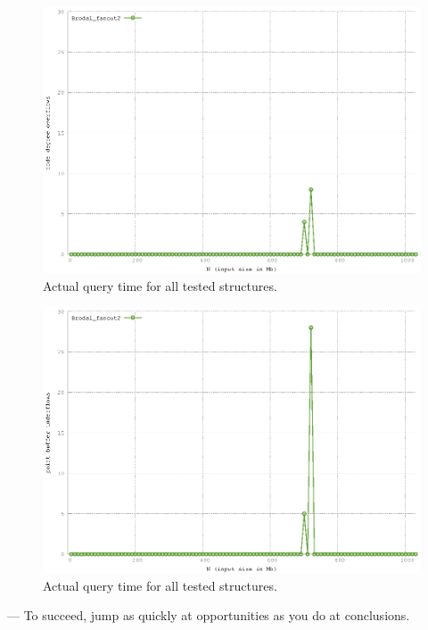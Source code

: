 \documentclass[twoside,11pt,openright]{report}
\begin{document}
\begin{figure}[htp!]
\includegraphics[width=\textwidth]{../src/experiments/query_experiment_results/final2/ndo}
\caption{Actual query time for all tested structures.}
\label{fig:result_query_search_complexity}
\end{figure}

\begin{figure}[htp!]
\includegraphics[width=\textwidth]{../src/experiments/query_experiment_results/final2/pbu}
\caption{Actual query time for all tested structures.}
\label{fig:result_query_search_complexity}
\end{figure}


\begin{savequote}[0.4\textwidth]
--- To succeed, jump as quickly at opportunities as you do at conclusions.
\end{savequote}
\end{document}
